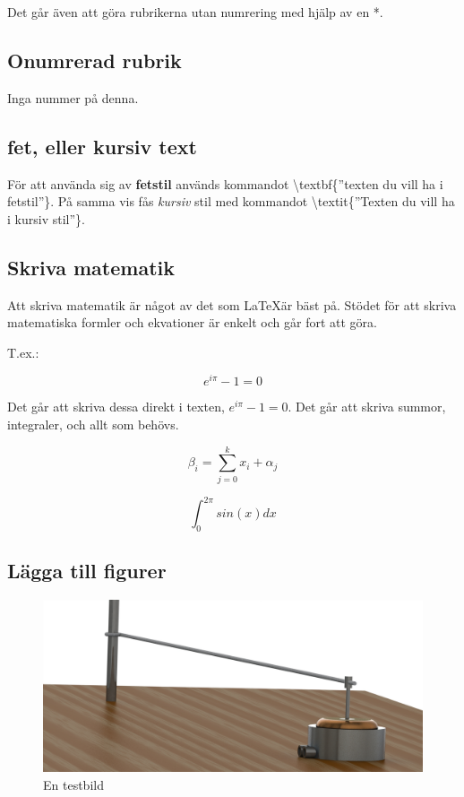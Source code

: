 \documentclass[12pt, a4paper]{article}
\begin{document}
Det går även att göra rubrikerna utan numrering med hjälp av en *.

\subsection*{Onumrerad rubrik}
Inga nummer på denna.

\subsection{fet, eller kursiv text}

För att använda sig av \textbf{fetstil} används kommandot \textbackslash textbf\{''texten du vill ha i fetstil''\}. På samma vis fås \textit{kursiv} stil 
med kommandot \textbackslash textit\{''Texten du vill ha i kursiv stil''\}.

\subsection{Skriva matematik}

Att skriva matematik är något av det som \LaTeX är bäst på. Stödet för att skriva matematiska formler och ekvationer är enkelt och
går fort att göra.

T.ex.:

\begin{equation}
e^{i\pi} - 1 = 0
\end{equation}

Det går att skriva dessa direkt i texten, $e^{i\pi} - 1 = 0$. Det går att skriva summor, integraler, och allt som behövs.

\begin{equation}
\beta_i = \sum_{j = 0}^{k} x_i + \alpha_j
\end{equation}

\begin{equation}
\int_0^{2\pi} sin(x) dx
\end{equation}

\subsection{Lägga till figurer}

\begin{figure}[H]
	\centering
	\includegraphics[width=0.5\linewidth]{test.JPG}
	\caption{En testbild}
	\label{fig:test}
\end{figure}
\end{document}
